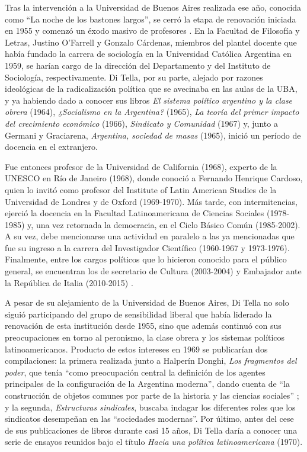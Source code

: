 Tras la intervención a la Universidad de Buenos Aires realizada ese año, conocida como \enquote{La noche de los bastones largos}, se cerró la etapa de renovación iniciada en 1955 y comenzó un éxodo masivo de profesores \parencite{1536-BUCHBINDER2010}. En la Facultad de Filosofía y Letras, Justino O'Farrell y Gonzalo Cárdenas, miembros del plantel docente que había fundado la carrera de sociología en la Universidad Católica Argentina en 1959, se harían cargo de la dirección del Departamento y del Instituto de Sociología, respectivamente. Di Tella, por su parte, alejado por razones ideológicas de la radicalización política que se avecinaba en las aulas de la UBA, y ya habiendo dado a conocer sus libros \emph{El sistema político argentino y la clase obrera} (1964), \emph{¿Socialismo en la Argentina?} (1965), \emph{La teoría del primer impacto del crecimiento económico} (1966), \emph{Sindicato y Comunidad} (1967) y, junto a Germani y Graciarena, \emph{Argentina, sociedad de masas} (1965), inició un período de docencia en el extranjero.

Fue entonces profesor de la Universidad de California (1968), experto de la UNESCO en Río de Janeiro (1968), donde conoció a Fernando Henrique Cardoso, quien lo invitó como profesor del Institute of Latin American Studies de la Universidad de Londres y de Oxford (1969-1970). Más tarde, con intermitencias, ejerció la docencia en la Facultad Latinoamericana de Ciencias Sociales (1978-1985) y, una vez retornada la democracia, en el Ciclo Básico Común (1985-2002). A su vez, debe mencionarse una actividad en paralelo a las ya mencionadas que fue su ingreso a la carrera del Investigador Científico (1960-1967 y 1973-1976). Finalmente, entre los cargos políticos que lo hicieron conocido para el público general, se encuentran los de secretario de Cultura (2003-2004) y Embajador ante la República de Italia (2010-2015) \parencite{1648-DITELLA2019}.

A pesar de su alejamiento de la Universidad de Buenos Aires, Di Tella no solo siguió participando del grupo de sensibilidad liberal que había liderado la renovación de esta institución desde 1955, sino que además continuó con sus preocupaciones en torno al peronismo, la clase obrera y los sistemas políticos latinoamericanos. Producto de estos intereses en 1969 se publicarían dos compilaciones: la primera realizada junto a Halperín Donghi, \emph{Los fragmentos del poder}, que tenía \enquote{como preocupación central la definición de los agentes principales de la configuración de la Argentina moderna}, dando cuenta de \enquote{la construcción de objetos comunes por parte de la historia y las ciencias sociales} \parencite[122]{1511-SARLO2001}; y la segunda, \emph{Estructuras sindicales}, buscaba indagar los diferentes roles que los sindicatos desempeñan en las \enquote{sociedades modernas}. Por último, antes del cese de sus publicaciones de libros durante casi 15 años, Di Tella daría a conocer una serie de ensayos reunidos bajo el título \emph{Hacia una política latinoamericana} (1970).

